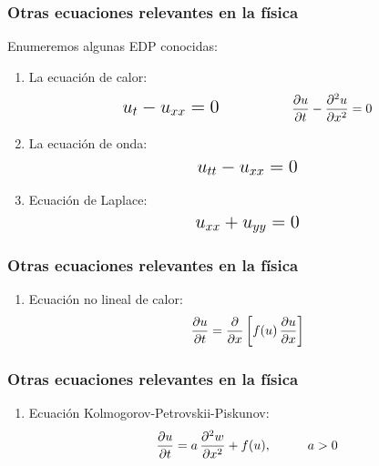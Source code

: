 \documentclass[12pt]{beamer}
\begin{document}
\begin{frame}
\frametitle{Otras ecuaciones relevantes en la física}
Enumeremos algunas EDP conocidas:
\pause
{}
\begin{enumerate}[<+->]
\item La ecuación de calor:
\begin{align*}
\text{\Large{$u_{t} - u_{xx} = 0$}} \hspace{2cm} \pdv{u}{t} - \pdv[2]{u}{x} = 0
\end{align*}
\item La ecuación de onda:
\begin{align*}
\text{\Large{$u_{tt} - u_{xx} = 0$}}
\end{align*}
\item Ecuación de Laplace:
\begin{align*}
\text{\Large{$u_{xx} + u_{yy} = 0$}}
\end{align*}
\seti
\end{enumerate}
\end{frame}
\begin{frame}
\frametitle{Otras ecuaciones relevantes en la física}
\begin{enumerate}[<+->]
\conti
\item Ecuación no lineal de calor:
\begin{align*}
\pdv{u}{t} = \pdv{x} \left[ f(u) \, \pdv{u}{x} \right]
\end{align*}
\seti
\end{enumerate}
\end{frame}
\begin{frame}
\frametitle{Otras ecuaciones relevantes en la física}
\begin{enumerate}[<+->]
\conti
\item Ecuación Kolmogorov-Petrovskii-Piskunov:
\begin{align*}
\pdv{u}{t} = a \, \pdv[2]{w}{x} + f(u), \hspace{1cm} a > 0
\end{align*}
\seti
\end{enumerate}
\end{frame}
\end{document}
